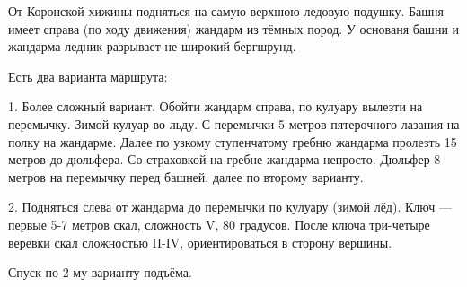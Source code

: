 От Коронской хижины подняться на самую верхнюю ледовую подушку. Башня
имеет справа (по ходу движения) жандарм из тёмных пород. У основаня
башни и жандарма ледник разрывает не широкий бергшрунд.

Есть два варианта маршрута:

1. Более сложный вариант. Обойти жандарм справа, по кулуару вылезти на
   перемычку. Зимой кулуар во льду. С перемычки 5 метров пятерочного
   лазания на полку на жандарме. Далее по узкому ступенчатому гребню
   жандарма пролезть 15 метров до дюльфера. Со страховкой на гребне
   жандарма непросто. Дюльфер 8 метров на перемычку перед башней,
   далее по второму варианту.

 2. Подняться слева от жандарма до перемычки по кулуару (зимой лёд).
    Ключ — первые 5-7 метров скал, сложность V, 80 градусов. После
    ключа три-четыре веревки скал сложностью II-IV, ориентироваться в
    сторону вершины.

Спуск по 2-му варианту подъёма.
